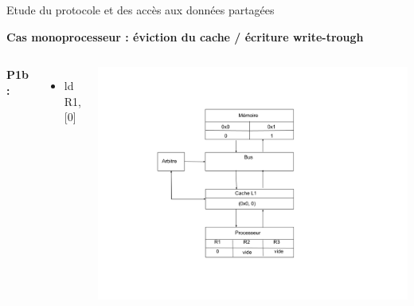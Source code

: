 \documentclass{beamer}
\begin{document}
\begin{frame}{Etude du protocole et des accès aux données partagées}
    \addtocounter{framenumber}{-1}
    \textbf{Cas monoprocesseur : éviction du cache / écriture write-trough}
    \begin{columns}[c] %

        \textbf{P1b : }
        \begin{itemize}
            \item ld R1, [0]
        \end{itemize}

        \includegraphics[scale=0.28]{f1.png}
        
    \end{columns}
\end{frame}
\end{document}
